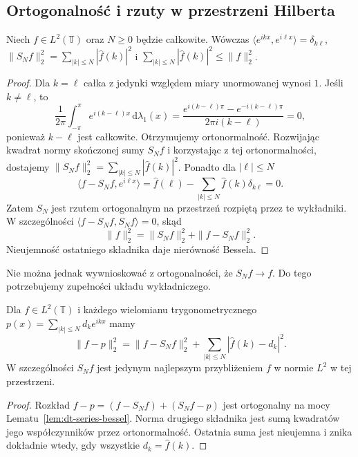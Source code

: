 \subsection{Ortogonalność i rzuty w przestrzeni Hilberta}

\begin{lemat}
\label{lem:dt-series-bessel}
Niech $f\in L^2(\mathbb T)$ oraz $N\geq0$ będzie całkowite. Wówczas
$\langle e^{ikx},e^{i\ell x}\rangle=\delta_{k\ell}$,
$\|S_Nf\|_2^2=\sum_{|k|\le N}|\widehat f(k)|^2$ i
$\sum_{|k|\le N}|\widehat f(k)|^2\le\|f\|_2^2$.
\end{lemat}
\begin{proof}
Dla $k=\ell$ całka z jedynki względem miary
unormowanej wynosi $1$. Jeśli $k\ne\ell$, to
\[
 \frac1{2\pi}\int_{-\pi}^{\pi}e^{i(k-\ell)x}\,
 \mathrm d\lambda_1(x)
 =\frac{e^{i(k-\ell)\pi}-e^{-i(k-\ell)\pi}}
 {2\pi i(k-\ell)}=0,
\]
ponieważ $k-\ell$ jest całkowite. Otrzymujemy
ortonormalność. Rozwijając kwadrat normy skończonej
sumy $S_Nf$ i korzystając z tej ortonormalności,
dostajemy $\|S_Nf\|_2^2=\sum_{|k|\le N}|\widehat f(k)|^2$.
Ponadto dla $|\ell|\leq N$
\[
 \langle f-S_Nf,e^{i\ell x}\rangle
 =\widehat f(\ell)-\sum_{|k|\leq N}
 \widehat f(k)\delta_{k\ell}=0.
\]
Zatem $S_N$ jest rzutem ortogonalnym na przestrzeń
rozpiętą przez te wykładniki. W szczególności
$\langle f-S_Nf,S_Nf\rangle=0$, skąd
\[
 \|f\|_2^2=\|S_Nf\|_2^2+\|f-S_Nf\|_2^2.
\]
Nieujemność ostatniego składnika daje nierówność Bessela.
\end{proof}

Nie można jednak wywnioskować z ortogonalności, że $S_Nf\to f$.
Do tego potrzebujemy zupełności układu wykładniczego.


\begin{wniosek}
\label{cor:dt-series-best-approx}
Dla $f\in L^2(\mathbb T)$ i każdego wielomianu
trygonometrycznego $p(x)=\sum_{|k|\le N}d_ke^{ikx}$
mamy
\[
 \|f-p\|_2^2=\|f-S_Nf\|_2^2+
 \sum_{|k|\le N}|\widehat f(k)-d_k|^2.
\]
W szczególności $S_Nf$ jest jedynym najlepszym
przybliżeniem $f$ w normie $L^2$ w tej przestrzeni.
\end{wniosek}
\begin{proof}
Rozkład $f-p=(f-S_Nf)+(S_Nf-p)$ jest ortogonalny
na mocy Lematu~\ref{lem:dt-series-bessel}.
Norma drugiego składnika jest sumą kwadratów
jego współczynników przez ortonormalność.
Ostatnia suma jest nieujemna i znika dokładnie
wtedy, gdy wszystkie $d_k=\widehat f(k)$.
\end{proof}

